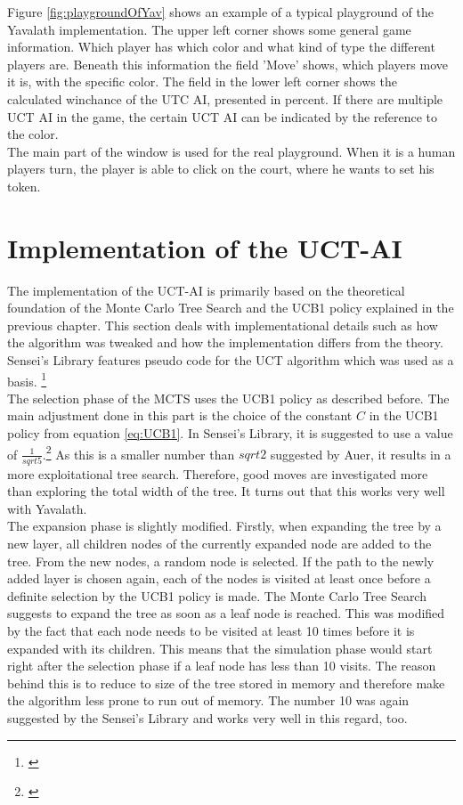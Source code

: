 \documentclass[german]{report}
\begin{document}
\noindent Figure \ref{fig:playgroundOfYav} shows an example of a typical playground of the Yavalath implementation. 
The upper left corner shows some general game information. Which player has which color and what kind of type the different 
players are. Beneath this information the field 'Move' shows, which players move it is, with the specific color. The field in the 
lower left corner shows the calculated winchance of the UTC AI, presented in percent. If there are multiple UCT AI in the game, the 
certain UCT AI can be indicated by the reference to the color.  \\
The main part of the window is used for the real playground. When it is a human players turn, the player is able to click on the court, 
where he wants to set his 
token. 

\section{Implementation of the UCT-AI}
The implementation of the UCT-AI is primarily based on the theoretical
foundation of the Monte Carlo Tree Search and the UCB1 policy explained in the
previous chapter. This section deals with implementational details such as how
the algorithm was tweaked and how the implementation differs from the theory. 
Sensei's Library features pseudo code for the UCT algorithm which was used as a
basis. \footnote{\cite{sl}}\\

The selection phase of the MCTS uses the UCB1 policy as described before. The
main adjustment done in this part is the choice of the constant \(C\) in the
UCB1 policy from equation \ref{eq:UCB1}. In Sensei's Library, it is suggested to
use a value of \(\frac{1}{sqrt{5}}\).\footnote{\cite{sl}} As this is a smaller
number than \(sqrt{2}\) suggested by Auer, it results in a more exploitational
tree search. Therefore, good moves are investigated more than exploring the
total width of the tree. It turns out that this works very well with Yavalath.\\

The expansion phase is slightly modified. Firstly, when expanding the tree by a
new layer, all children nodes of the currently expanded node are added to the
tree. From the new nodes, a random node is selected. If the path to the newly
added layer is chosen again, each of the nodes is visited at least once before a
definite selection by the UCB1 policy is made. The Monte Carlo Tree Search
suggests to expand the tree as soon as a leaf node is reached. This was modified
by the fact that each node needs to be visited at least 10 times before it is
expanded with its children. This means that the simulation phase would start
right after the selection phase if a leaf node has less than 10 visits. The
reason behind this is to reduce to size of the tree stored in memory and
therefore make the algorithm less prone to run out of memory. The number 10 was
again suggested by the Sensei's Library and works very well in this regard, too.\\
\end{document}
